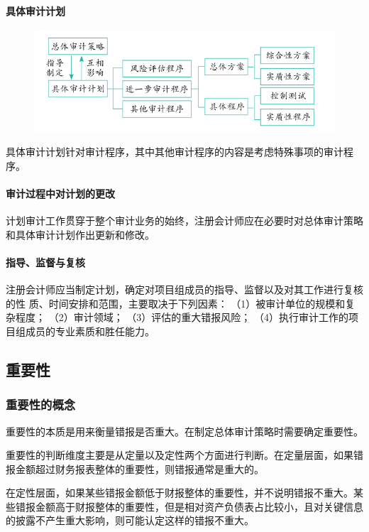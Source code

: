\documentclass[UTF8,12pt]{ctexart}
\numberwithin{equation}{section} %
\numberwithin{figure}{section}
\numberwithin{table}{section}
\begin{document}
	
	
	
	\paragraph{具体审计计划}
	\begin{figure}[th]
		\centering
		\includegraphics[width=0.7\linewidth]{screenshot001}
		\caption{}
		\label{fig:screenshot001}
	\end{figure}
	
	具体审计计划针对审计程序，其中其他审计程序的内容是考虑特殊事项的审计程序。
	
	\paragraph{审计过程中对计划的更改}
	计划审计工作贯穿于整个审计业务的始终，注册会计师应在必要时对总体审计策略和具体审计计划作出更新和修改。
	
	\paragraph{指导、监督与复核}
	注册会计师应当制定计划，确定对项目组成员的指导、监督以及对其工作进行复核的性
	质、时间安排和范围，主要取决于下列因素：
	（1）被审计单位的规模和复杂程度；
	（2）审计领域；
	（3）评估的重大错报风险；
	（4）执行审计工作的项目组成员的专业素质和胜任能力。
	
	\subsection{重要性}
	
	\subsubsection{重要性的概念}
	重要性的本质是用来衡量错报是否重大。在制定总体审计策略时需要确定重要性。
	
	重要性的判断维度主要是从定量以及定性两个方面进行判断。在定量层面，如果错报金额超过财务报表整体的重要性，则错报通常是重大的。
	
	在定性层面，如果某些错报金额低于财报整体的重要性，并不说明错报不重大。某些错报金额高于财报整体的重要性，但是相对资产负债表占比较小，且对关键信息的披露不产生重大影响，则可能认定这样的错报不重大。
	
\end{document}
